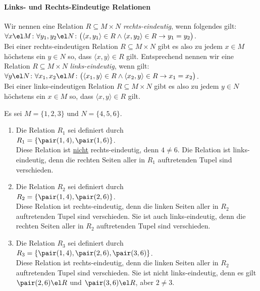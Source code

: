 \paragraph{Links- und Rechts-Eindeutige Relationen}
Wir nennen eine Relation $R \subseteq M \times N$ 
\emph{rechts-eindeutig}, wenn folgendes gilt: \\[0.2cm]
\hspace*{1.3cm} 
$\forall x \el M \colon \forall y_1, y_2 \el N \colon \bigl(\langle x, y_1 \rangle \in R \wedge \langle x, y_2 \rangle \in R \rightarrow y_1 = y_2\bigr)$.
\\[0.2cm]
Bei einer rechts-eindeutigen Relation $R \subseteq M \times N$ gibt es also zu jedem $x\in M$ höchstens ein $y \in N$ so,
dass $\langle x, y \rangle \in R$ gilt.  Entsprechend nennen wir eine Relation $R \subseteq M \times N$ 
\emph{links-eindeutig}, wenn gilt: \\[0.2cm]
\hspace*{1.3cm} 
$\forall y \el N \colon \forall x_1, x_2 \el M \colon \bigl(\langle x_1, y \rangle \in R \wedge \langle x_2, y \rangle \in R \rightarrow x_1 = x_2\bigr)$.
\\[0.2cm]
Bei einer links-eindeutigen Relation $R \subseteq M \times N$ 
gibt es also zu jedem $y\in N$ höchstens ein $x \in M$ so,
dass $\langle x, y \rangle \in R$ gilt.
\vspace{0.2cm}

\examples
Es sei $M = \{1,2,3\}$ und $N = \{4,5,6\}$.
\begin{enumerate}
\item Die Relation $R_1$ sei definiert durch \\[0.2cm]
      \hspace*{1.3cm} $R_1 = \{ \pair(1,4), \pair(1,6) \}$. \\[0.2cm]
      Diese Relation ist \underline{nicht} rechts-eindeutig, denn  $4 \not= 6$.
      Die Relation ist links-eindeutig, denn die rechten Seiten aller in $R_1$
      auftretenden Tupel sind verschieden.
\item Die Relation $R_2$ sei definiert durch \\[0.2cm]
      \hspace*{1.3cm} $R_2 = \{ \pair(1,4), \pair(2,6) \}$. \\[0.2cm]
      Diese Relation ist rechts-eindeutig, denn die linken Seiten aller in $R_2$ auftretenden
      Tupel sind verschieden.  Sie ist auch links-eindeutig, denn die rechten Seiten aller
      in $R_2$ auftretenden Tupel sind verschieden. 
\item Die Relation $R_3$ sei definiert durch \\[0.2cm]
      \hspace*{1.3cm} $R_3 = \{ \pair(1,4), \pair(2,6), \pair(3,6) \}$. \\[0.2cm]
      Diese Relation ist rechts-eindeutig, denn die linken Seiten aller in $R_2$       auftretenden
      Tupel sind verschieden.  Sie ist nicht links-eindeutig, denn es gilt
      $\pair(2,6) \el R$ und $\pair(3,6) \el R$, aber $2 \not= 3$.
      \eox
\end{enumerate}

